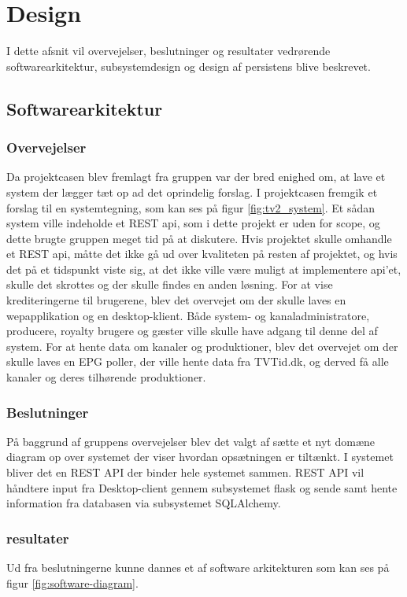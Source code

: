 \section{Design}
I dette afsnit vil overvejelser, beslutninger og resultater vedrørende softwarearkitektur, subsystemdesign og design af persistens blive beskrevet. 

\subsection{Softwarearkitektur}
\subsubsection{Overvejelser}
Da projektcasen blev fremlagt fra gruppen var der bred enighed om, at lave et system der lægger tæt op ad det oprindelig forslag. I projektcasen fremgik et forslag til en systemtegning, som kan ses på figur \ref{fig:tv2_system}. Et sådan system ville indeholde et REST api, som i dette projekt er uden for scope, og dette brugte gruppen meget tid på at diskutere. Hvis projektet skulle omhandle et REST api, måtte det ikke gå ud over kvaliteten på resten af projektet, og hvis det på et tidspunkt viste sig, at det ikke ville være muligt at implementere api'et, skulle det skrottes og der skulle findes en anden løsning. For at vise krediteringerne til brugerene, blev det overvejet om der skulle laves en wepapplikation og en desktop-klient. Både system- og kanaladministratore, producere, royalty brugere og gæster ville skulle have adgang til denne del af system. For at hente data om kanaler og produktioner, blev det overvejet om der skulle laves en EPG poller, der ville hente data fra TVTid.dk, og derved få alle kanaler og deres tilhørende produktioner. 

\subsubsection{Beslutninger}
På baggrund af gruppens overvejelser blev det valgt af sætte et nyt domæne diagram op over systemet der viser hvordan opsætningen er tiltænkt. I systemet bliver det en REST API der binder hele systemet sammen. REST API vil håndtere input fra Desktop-client gennem subsystemet flask og sende samt hente information fra databasen via subsystemet SQLAlchemy. 

\subsubsection{resultater}
Ud fra beslutningerne kunne dannes et  af software arkitekturen som kan ses på figur \ref{fig:software-diagram}.\\

